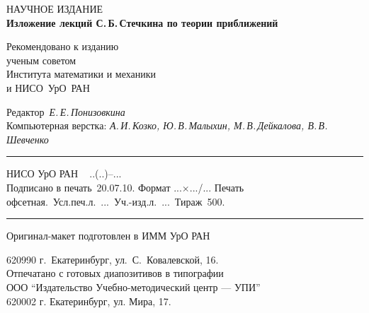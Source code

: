 \documentclass{report}
\begin{document}
 \newpage
\thispagestyle{empty}
\normalsize
\begin{center}
НАУЧНОЕ ИЗДАНИЕ\\[24pt]
{\large\textbf{Изложение лекций С.\,Б.\,Стечкина по теории приближений}}\\[4pt]


\vspace{28pt}

Рекомендовано к изданию\\
ученым советом\\
Института математики и механики\\
и НИСО\ УрО\ РАН
\end{center}

\vspace{5pt}




\begin{center}

    Редактор~{\em{Е.\,Е.\,Понизовкина}}\\[2ex]

 Компьютерная верстка: {\em{А.\,И.\,Козко, Ю.\,В.\,Малыхин,
М.\,В.\,Дейкалова, В.\,В.\,Шевченко}}\\[1ex]

\end{center}
\vfill

\hrule

\begin{center}  \footnotesize \noindent НИСО УрО РАН\,\ \No~..(..)--...\\
Подписано в печать~20.07.10. Формат ...$\times$.../...\linebreak
Печать офсетная.\ Усл.печ.л.~...\ Уч.-изд.л.~...\
Тираж~500.\linebreak %
\hrule
\end{center}

\begin{center}
\footnotesize
 Оригинал-макет подготовлен в ИММ УрО РАН\\[2pt]
\end{center}

\begin{center}
\footnotesize
     620990 г.~Екатеринбург,
     ул.\ С.~Ковалевской, 16.\\ [2ex]

Отпечатано с готовых диапозитивов в типографии \\ ООО
``Издательство Учебно-методический центр --- УПИ''\\ 620002 г.
Екатеринбург, ул.  Мира, 17.

\end{center}
\end{document}
